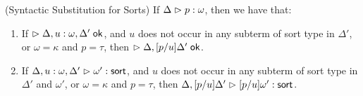\begin{lemma}{(Syntactic Substitution for Sorts)}
If $\judgeA{p}{\omega}$, then we have that:

\begin{enumerate}
\item If $\judgeACtx{\Delta, u:\omega, \Delta'}$, and $u$ does not occur in any subterm of sort type in $\Delta'$, or $\omega = \kappa$ and $p = \tau$,  then  
         $\judgeACtx{\Delta, [p/u]\Delta'}$. 
\item If $\judgeSort[\Delta, u:\omega, \Delta']{\omega'}$, and $u$ does not occur in any subterm of sort type in $\Delta'$ and $\omega'$, or $\omega = \kappa$ and $p = \tau$, then
         $\judgeSort[{\Delta, [p/u]\Delta'}]{[p/u]\omega'}$. 
\end{enumerate}
\end{lemma}
